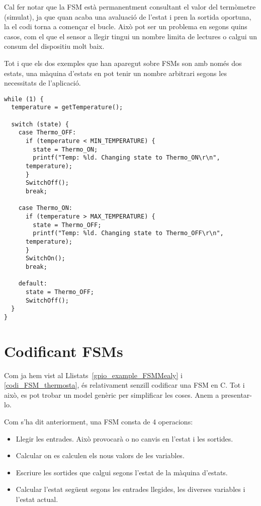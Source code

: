 Cal fer notar que la FSM està permanentment consultant el valor del termòmetre (simulat), ja que quan acaba una avaluació de l'estat i pren la sortida oportuna, la el codi torna a començar el bucle. Això pot ser un problema en segons quins casos, com el que el sensor a llegir tingui un nombre limita de lectures o calgui un consum del dispositiu molt baix.

\begin{remark}
 Tot i que els dos exemples que han aparegut sobre FSMs son amb només dos estats, una màquina d'estats en pot tenir un nombre arbitrari segons les necessitats de l'aplicació.
\end{remark}


\begin{lstlisting}[style=customc,caption=Codi de la FSM per un termòstat senzill,label=codi_FSM_thermosta]
while (1) {
  temperature = getTemperature();

  switch (state) {
    case Thermo_OFF:
      if (temperature < MIN_TEMPERATURE) {
        state = Thermo_ON;
        printf("Temp: %ld. Changing state to Thermo_ON\r\n",
	  temperature);
      }
      SwitchOff();
      break;
      
    case Thermo_ON:
      if (temperature > MAX_TEMPERATURE) {
        state = Thermo_OFF;
        printf("Temp: %ld. Changing state to Thermo_OFF\r\n",
	  temperature);
      }
      SwitchOn();
      break;
    
    default:
      state = Thermo_OFF;
      SwitchOff();
  }
} 
\end{lstlisting}

\section{Codificant FSMs}

Com ja hem vist al Llistats~\ref{gpio_example_FSMMealy} i \ref{codi_FSM_thermosta}, és relativament senzill codificar una FSM en C. Tot i això, es pot trobar un model genèric per simplificar les coses. Anem a presentar-lo.

Com s'ha dit anteriorment, una FSM consta de 4 operacions:

\begin{itemize}
 \item Llegir les entrades. Això provocarà o no canvis en l'estat i les sortides.
 \item Calcular on es calculen els nous valors de les variables.
 \item Escriure les sortides que calgui segons l'estat de la màquina d'estats.
 \item Calcular l'estat següent segons les entrades llegides, les diverses variables i l'estat actual.
\end{itemize}

